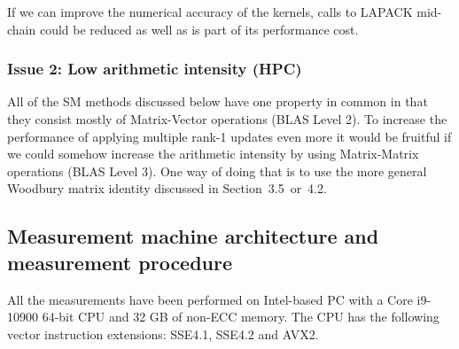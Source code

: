 \documentclass[11pt]{article}
\numberwithin{figure}{section}
\numberwithin{table}{section}
\begin{document}
      If we can improve the numerical accuracy of the kernels, calls to LAPACK mid-chain could be reduced as well as is part of its performance cost.
    
    \subsubsection{Issue 2: Low arithmetic intensity (HPC)}
      All of the SM methods discussed below have one property in common in that they consist mostly of Matrix-Vector operations (BLAS Level 2). To increase the performance of applying multiple rank-1 updates even more it would be fruitful if we could somehow increase the arithmetic intensity by using Matrix-Matrix operations (BLAS Level 3). One way of doing that is to use the more general Woodbury matrix identity discussed in Section~3.5~or~4.2.
				
    \subsection{Measurement machine architecture and measurement procedure}
      All the measurements have been performed on Intel-based PC with a Core i9-10900 64-bit CPU and 32 GB of non-ECC memory. The CPU has the following vector instruction extensions: SSE4.1, SSE4.2 and AVX2.\\
    
\end{document}
